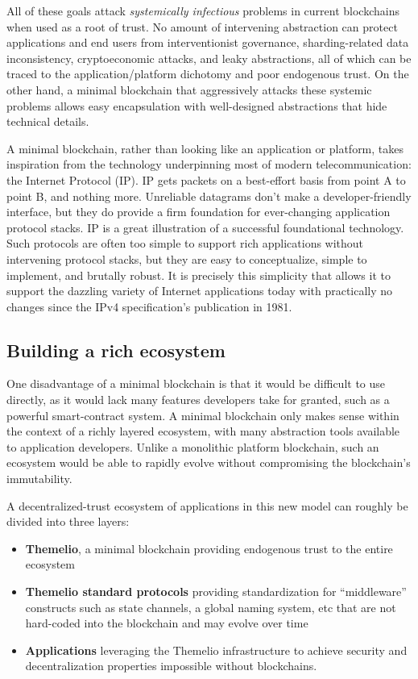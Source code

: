 \documentclass[headinclude,12pt]{scrbook}
\begin{document}
All of these goals attack \emph{systemically infectious} problems in current blockchains when used as a root of trust. No amount of intervening abstraction can protect applications and end users from interventionist governance, sharding-related data inconsistency, cryptoeconomic attacks, and leaky abstractions, all of which can be traced to the application/platform dichotomy and poor endogenous trust. On the other hand, a minimal blockchain that aggressively attacks these systemic problems allows easy encapsulation with well-designed abstractions that hide technical details.

A minimal blockchain, rather than looking like an application or platform, takes inspiration from the technology underpinning most of modern telecommunication: the Internet Protocol (IP). IP gets packets on a best-effort basis from point A to point B, and nothing more. Unreliable datagrams don't make a developer-friendly interface, but they do provide a firm foundation for ever-changing application protocol stacks. IP is a great illustration of a successful foundational technology. Such protocols are often too simple to support rich applications without intervening protocol stacks, but they are easy to conceptualize, simple to implement, and brutally robust. It is precisely this simplicity that allows it to support the dazzling variety of Internet applications today with practically no changes since the IPv4 specification's publication in 1981.

\subsection{Building a rich ecosystem}

One disadvantage of a minimal blockchain is that it would be difficult to use directly, as it would lack many features developers take for granted, such as a powerful smart-contract system. A minimal blockchain only makes sense within the context of a richly layered ecosystem, with many abstraction tools available to application developers. Unlike a monolithic platform blockchain, such an ecosystem would be able to rapidly evolve without compromising the blockchain's immutability.

A decentralized-trust ecosystem of applications in this new model can roughly be divided into three layers:

\begin{itemize}
    \item \textbf{Themelio}, a minimal blockchain providing endogenous trust to the entire ecosystem
    \item \textbf{Themelio standard protocols} providing standardization for ``middleware'' constructs such as state channels, a global naming system, etc that are not hard-coded into the blockchain and may evolve over time
    \item \textbf{Applications} leveraging the Themelio infrastructure to achieve security and decentralization properties impossible without blockchains.
\end{itemize}
\end{document}
